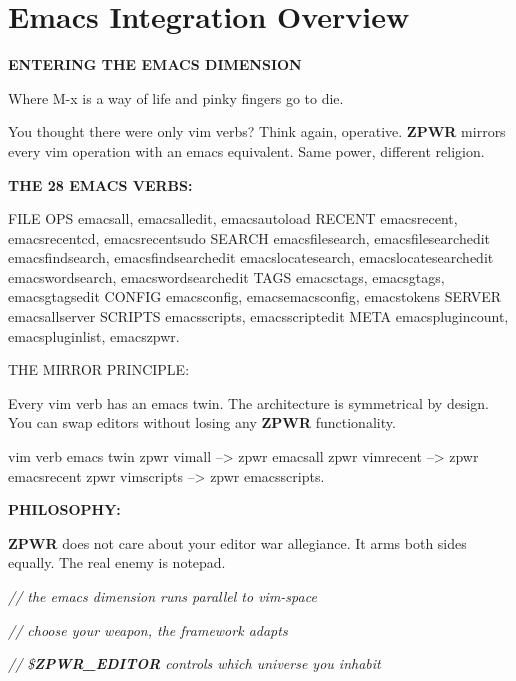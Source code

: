 \documentclass[11pt,a4paper,twoside]{book}
\begin{document}
\section{Emacs Integration Overview}


\vspace{10pt}
{\large\bfseries\color{neoncyan} ENTERING THE EMACS DIMENSION}\vspace{6pt}

Where M-x is a way of life and pinky fingers go to die.

You thought there were only vim verbs? Think again, operative. \textbf{ZPWR} mirrors every vim operation with an emacs equivalent. Same power, different religion.


\vspace{12pt}
{\bfseries\color{neonyellow} THE 28 EMACS VERBS:}\vspace{4pt}

FILE OPS      emacsall, emacsalledit, emacsautoload RECENT        emacsrecent, emacsrecentcd, emacsrecentsudo SEARCH        emacsfilesearch, emacsfilesearchedit emacsfindsearch, emacsfindsearchedit emacslocatesearch, emacslocatesearchedit emacswordsearch, emacswordsearchedit TAGS          emacsctags, emacsgtags, emacsgtagsedit CONFIG        emacsconfig, emacsemacsconfig, emacstokens SERVER        emacsallserver SCRIPTS       emacsscripts, emacsscriptedit META          emacsplugincount, emacspluginlist, emacszpwr.

THE MIRROR PRINCIPLE:

Every vim verb has an emacs twin. The architecture is symmetrical by design. You can swap editors without losing any \textbf{ZPWR} functionality.

vim verb              emacs twin zpwr vimall     -->   zpwr emacsall zpwr vimrecent  -->   zpwr emacsrecent zpwr vimscripts -->   zpwr emacsscripts.


\vspace{12pt}
{\bfseries\color{neonyellow} PHILOSOPHY:}\vspace{4pt}

\textbf{ZPWR} does not care about your editor war allegiance. It arms both sides equally. The real enemy is notepad.

{\small\itshape\color{dimtext} // the emacs dimension runs parallel to vim-space}

{\small\itshape\color{dimtext} // choose your weapon, the framework adapts}

{\small\itshape\color{dimtext} // \$\textbf{ZPWR\_EDITOR} controls which universe you inhabit}
\end{document}
